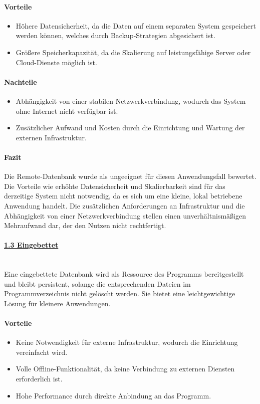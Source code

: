 \documentclass[a4paper,12pt]{report}
\begin{document}
    \paragraph*{Vorteile}
    \begin{itemize}
        \item Höhere Datensicherheit, da die Daten auf einem separaten System gespeichert werden können, welches durch Backup-Strategien abgesichert ist.
        \item Größere Speicherkapazität, da die Skalierung auf leistungsfähige Server oder Cloud-Dienste möglich ist.
    \end{itemize}

    \paragraph*{Nachteile}
    \begin{itemize}
        \item Abhängigkeit von einer stabilen Netzwerkverbindung, wodurch das System ohne Internet nicht verfügbar ist.
        \item Zusätzlicher Aufwand und Kosten durch die Einrichtung und Wartung der externen Infrastruktur.
    \end{itemize}

    \paragraph*{Fazit}
    Die Remote-Datenbank wurde als ungeeignet für diesen Anwendungsfall bewertet.
    Die Vorteile wie erhöhte Datensicherheit und Skalierbarkeit sind für das derzeitige System nicht notwendig, da es sich um eine kleine, lokal betriebene Anwendung handelt.
    Die zusätzlichen Anforderungen an Infrastruktur und die Abhängigkeit von einer Netzwerkverbindung stellen einen unverhältnismäßigen Mehraufwand dar, der den Nutzen nicht rechtfertigt.

    \paragraph*{\underline{1.3 Eingebettet}}\mbox{}\\
    Eine eingebettete Datenbank wird als Ressource des Programms bereitgestellt und bleibt persistent, solange die entsprechenden Dateien im Programmverzeichnis nicht gelöscht werden.
    Sie bietet eine leichtgewichtige Lösung für kleinere Anwendungen.

    \paragraph*{Vorteile}
    \begin{itemize}
        \item Keine Notwendigkeit für externe Infrastruktur, wodurch die Einrichtung vereinfacht wird.
        \item Volle Offline-Funktionalität, da keine Verbindung zu externen Diensten erforderlich ist.
        \item Hohe Performance durch direkte Anbindung an das Programm.
    \end{itemize}
\end{document}
